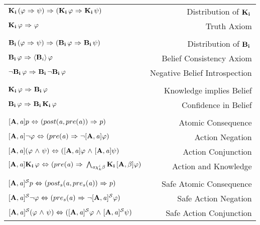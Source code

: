 \begin{table}[H]
\begin{center}
\begin{tabular}{| l r |}
	\hline
    $\Kns{i}(\varphi \iimplies \psi) \iimplies (\Kns{i}\varphi \iimplies \Kns{i}\psi)$ & Distribution of $\Kns{i}$ \\
    $\Kns{i}\varphi \iimplies \varphi$ & Truth Axiom \\
    &\\
    $\Bels{i}(\varphi \iimplies \psi) \iimplies (\Bels{i}\varphi \iimplies \Bels{i}\psi)$ & Distribution of $\Bels{i}$\\
    $\Bels{i}\varphi \iimplies \BPoss{i}\varphi$ & Belief Consistency Axiom\\
    $\tlnot\Bels{i}\varphi \iimplies \Bels{i}\tlnot\Bels{i}\varphi$ & Negative Belief Introspection\\
    &\\
    $\Kns{i}\varphi \iimplies \Bels{i}\varphi$ & Knowledge implies Belief \\
    $\Bels{i}\varphi \iimplies \Bels{i}\Kns{i}\varphi$ & Confidence in Belief\\
	&\\
    $\Pal{A,\laa}p \iiff (post(\laa, pre(\laa)) \iimplies p)$ & Atomic Consequence\\
    $\Pal{A,\laa}\tlnot \varphi \iiff (pre(\laa) \iimplies \tlnot \Pal{A,\laa}\varphi)$ & Action Negation\\
    $\Pal{A,\laa}(\varphi \tland \psi) \iiff (\Pal{A,\laa}\varphi \tland \Pal{A,\laa}\psi)$ & Action Conjunction\\
    $\Pal{A,\laa}\Kns{i}\varphi \iiff (pre(\laa)\iimplies \bigwedge_{\laa\chi_{k}^i\beta}\Kns{i}\Pal{A,\beta}\varphi)$ & Action and Knowledge\\
    &\\
    $\SPal{A,\laa}p \iiff (post_s(\laa, pre_s(\laa)) \iimplies p)$ & Safe Atomic Consequence\\
    $\SPal{A,\laa}\tlnot \varphi \iiff (pre_s(\laa) \iimplies \tlnot \SPal{A,\laa}\varphi)$ & Safe Action Negation\\
    $\SPal{A,\laa}(\varphi \tland \psi) \iiff (\SPal{A,\laa}\varphi \tland \SPal{A,\laa}\psi)$ & Safe Action Conjunction\\

\end{tabular}
\end{center}
\end{table}
